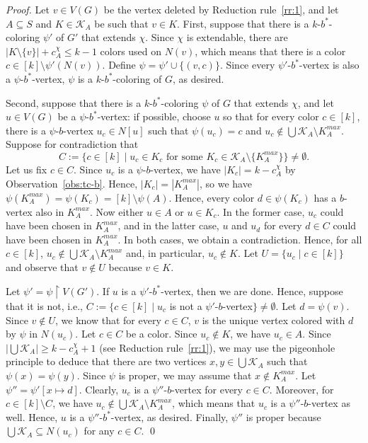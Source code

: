 \documentclass[runningheads, envcountsame]{llncs}
\newcommand{\sep}{\;|\;}
\newcommand{\seq}{\subseteq}
\newcommand{\ca}{\mathcal}
\begin{document}
\begin{proof}
Let $v \in V(G)$ be the vertex deleted by Reduction rule~\ref{rr:1}, and let $A \seq S$ and $K \in \ca K_A$ be such that $v \in K$.
First, suppose that there is a $k$-$b^*$-coloring $\psi'$ of $G'$ that extends $\chi$.
Since $\chi$ is extendable, there are $|K \setminus \{v\}| + c_A^\chi \le k-1$ colors used on $N(v)$, which means that there is a color $c \in [k] \setminus \psi'(N(v))$.
Define $\psi = \psi' \cup \{(v, c)\}$.
Since every $\psi'$-$b^*$-vertex is also a $\psi$-$b^*$-vertex, $\psi$ is a $k$-$b^*$-coloring of $G$, as desired.

Second, suppose that there is a $k$-$b^*$-coloring $\psi$ of $G$ that extends $\chi$, and let $u \in V(G)$ be a $\psi$-$b^*$-vertex: if possible, choose $u$ so that for every color $c \in [k]$, there is a $\psi$-$b$-vertex $u_c \in N[u]$ such that $\psi(u_c) = c$ and $u_c \notin \bigcup \ca K_A \setminus K_A^{max}$.
Suppose for contradiction that \[C := \{c \in [k] \sep u_c \in K_c \text{ for some }K_c \in \ca K_A \setminus \{K_A^{max}\}\} \ne \emptyset.\]
Let us fix $c \in C$.
Since $u_c$ is a $\psi$-$b$-vertex, we have $|K_c| = k - c^\chi_A$ by Observation~\ref{obs:tc-b}.
Hence, $|K_c| = |K_A^{max}|$, so we have $\psi(K_A^{max}) = \psi(K_c) = [k] \setminus \psi(A)$.
Hence, every color $d \in \psi(K_c)$ has a $b$-vertex also in $K_A^{max}$.
Now either $u \in A$ or $u \in K_c$.
In the former case,  $u_c$ could have been chosen in $K_A^{max}$,
and in the latter case, $u$ and $u_d$ for every $d \in C$ could have been chosen in $K_A^{max}$.
In both cases, we obtain a contradiction.
Hence, for all $c \in [k]$, $u_c \notin \bigcup \ca K_A \setminus K_A^{max}$ and, in particular, $u_c \notin K$.
Let $U = \{u_c \sep c \in [k]\}$ and observe that $v \notin U$ because $v \in K$.

Let $\psi' = \psi \upharpoonright V(G')$.
If $u$ is a $\psi'$-$b^*$-vertex, then we are done.
Hence, suppose that it is not, i.e., $C := \{c \in [k] \sep u_c$ is not a $\psi'$-$b$-vertex$\} \ne \emptyset$.
Let $d = \psi(v)$.
Since $v \notin U$, we know that for every $c \in C$, $v$ is the unique vertex colored with $d$ by $\psi$ in $N(u_c)$.
Let $c \in C$ be a color.
Since $u_c \notin K$, we have $u_c \in A$.
Since $|\bigcup \ca K_A| \ge k - c_A^\chi + 1$ (see Reduction rule~\ref{rr:1}), we may use the pigeonhole principle to deduce that there are two vertices $x, y \in \bigcup \ca K_A$ such that $\psi(x) = \psi(y)$.
Since $\psi$ is proper, we may assume that $x \notin K_A^{max}$.
Let $\psi'' = \psi'[x \mapsto d]$.
Clearly, $u_c$ is a $\psi''$-$b$-vertex for every $c \in C$.
Moreover, for $c \in [k] \setminus C$, we have $u_c \notin \bigcup \ca K_A \setminus K_A^{max}$, which means that $u_c$ is a $\psi''$-$b$-vertex as well.
Hence, $u$ is a $\psi''$-$b^*$-vertex, as desired.
Finally, $\psi''$ is proper because $\bigcup \ca K_A \seq N(u_c)$ for any $c \in C$.
\qed\end{proof}
\end{document}
